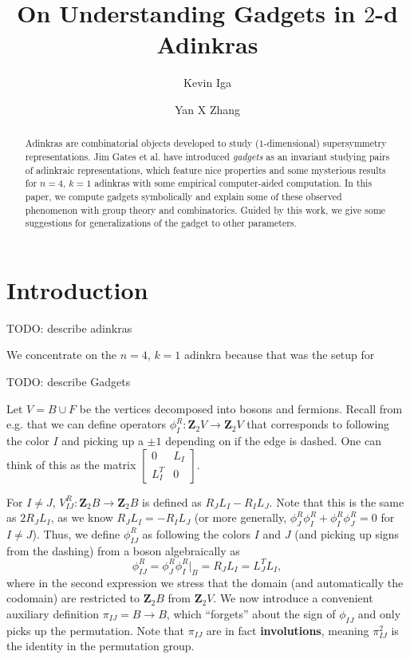 \documentclass[12pt,twoside,singlespace]{amsart}
\title{On Understanding Gadgets in $2$-d Adinkras}
\author{Kevin Iga}
\author{Yan X Zhang}
\numberwithin{equation}{section}
\theoremstyle{definition}
\newcommand{\ZZ}{\mathbf{Z}}
\begin{document}
\pagestyle{plain}


\begin{abstract}
Adinkras are combinatorial objects developed to study ($1$-dimensional) supersymmetry representations. Jim Gates et al. have introduced \emph{gadgets} as an invariant studying pairs of adinkraic representations, which feature nice properties and some mysterious results for $n=4$, $k=1$ adinkras with some empirical computer-aided computation. In this paper, we compute gadgets symbolically and explain some of these observed phenomenon with group theory and combinatorics. Guided by this work, we give some suggestions for generalizations of the gadget to other parameters.
\end{abstract}

\maketitle


\section{Introduction}

TODO: describe adinkras

We concentrate on the $n=4$, $k=1$ adinkra because that was the setup for \cite{gates:big_gadgets}

TODO: describe Gadgets

Let $V = B \cup F$ be the vertices decomposed into bosons and fermions. Recall from e.g. \cite{somewhere} that we can define operators $\phi_I^R: \ZZ_2V \rightarrow \ZZ_2V$ that corresponds to following the color $I$ and picking up a $\pm 1$ depending on if the edge is dashed. One can think of this as the matrix $\begin{bmatrix} 0 & L_I \\ L_I^T & 0 \end{bmatrix}$.

For $I \neq J$, $V_{IJ}^R: \ZZ_2B \rightarrow \ZZ_2B$ is defined as $R_JL_I - R_IL_J$. Note that this is the same as $2R_JL_I$, as we know $R_JL_I = - R_IL_J$ (or more generally, $\phi^R_J\phi^R_I + \phi^R_I\phi^R_J = 0$ for $I \neq J$). Thus, we define $\phi_{IJ}^R$ as following the colors $I$ and $J$ (and picking up signs from the dashing) from a boson algebraically as 
\[
\phi_{IJ}^R = \phi_J^R \phi_I^R|_B = R_JL_I = L_J^TL_I,
\] 
where in the second expression we stress that the domain (and automatically the codomain) are restricted to $\ZZ_2B$ from $\ZZ_2V$. We now introduce a convenient auxiliary definition $\pi_{IJ} = B \rightarrow B$, which ``forgets'' about the sign of $\phi_{IJ}$ and only picks up the permutation. Note that $\pi_{IJ}$ are in fact \textbf{involutions}, meaning $\pi_{IJ}^2$ is the identity in the permutation group.
\end{document}
